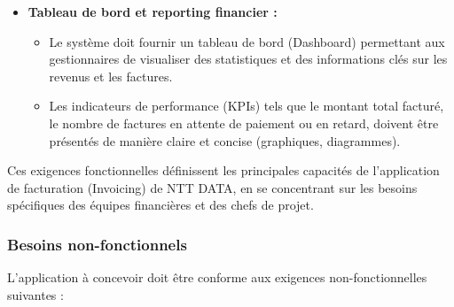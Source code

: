 \documentclass[12pt, a4paper, openany]{report}
\begin{document}
\begin{itemize}
    \vspace{-0.4cm}
    \item \textcolor{primaryBlue}{\textbf{Tableau de bord et reporting financier :}}
    \begin{itemize}
        \renewcommand{\labelitemii}{\textcolor{royalBlue}{\textbullet}}
        \setlength{\itemsep}{0.2cm}
        \vspace{0.2cm}
        
        \vspace{-0.3cm}
        \item Le système doit fournir un tableau de bord (Dashboard) permettant aux gestionnaires de visualiser des statistiques et des informations clés sur les revenus et les factures.
        \vspace{-0.3cm}
        \item Les indicateurs de performance (KPIs) tels que le montant total facturé, le nombre de factures en attente de paiement ou en retard, doivent être présentés de manière claire et concise (graphiques, diagrammes).
    \end{itemize}
\end{itemize} %

\vspace{-0.4cm}

Ces exigences fonctionnelles définissent les principales capacités de l'application de facturation (Invoicing) de NTT DATA, en se concentrant sur les besoins spécifiques des équipes financières et des chefs de projet.

\vspace{-0.5cm}

\subsubsection{Besoins non-fonctionnels}

\vspace{-0.4cm}
L'application à concevoir doit être conforme aux exigences non-fonctionnelles suivantes :

\vspace{-0.1cm}
\end{document}
